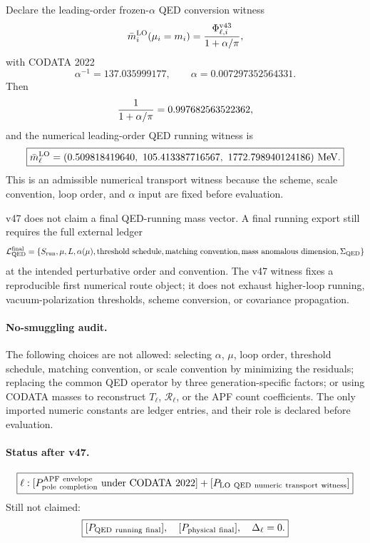 \begin{theorem}
Declare the leading-order frozen-\(\alpha\) QED conversion witness
\[
\bar m_i^{\rm LO}(\mu_i=m_i)
=
{\Phi_{\ell,i}^{\rm v43}\over 1+\alpha/\pi},
\]
with CODATA 2022
\[
\alpha^{-1}=137.035999177,
\qquad
\alpha=0.007297352564331.
\]
Then
\[
{1\over 1+\alpha/\pi}=0.997682563522362,
\]
and the numerical leading-order QED running witness is
\[
\boxed{
\bar m_\ell^{\rm LO}
=(0.509818419640,\ 105.413387716567,\ 1772.798940124186)\ {\rm MeV}.
}
\]
This is an admissible numerical transport witness because the scheme, scale convention, loop order, and \(\alpha\) input are fixed before evaluation.
\end{theorem}

\begin{corollary}
v47 does not claim a final QED-running mass vector.  A final running export still requires the full external ledger
\[
\mathcal L_{\rm QED}^{\rm final}
=\{S_{\rm run},\mu,L,\alpha(\mu),\text{threshold schedule},\text{matching convention},\text{mass anomalous dimension},\Sigma_{\rm QED}\}
\]
at the intended perturbative order and convention.  The v47 witness fixes a reproducible first numerical route object; it does not exhaust higher-loop running, vacuum-polarization thresholds, scheme conversion, or covariance propagation.
\end{corollary}

\paragraph{No-smuggling audit.}
The following choices are not allowed: selecting \(\alpha\), \(\mu\), loop order, threshold schedule, matching convention, or scale convention by minimizing the residuals; replacing the common QED operator by three generation-specific factors; or using CODATA masses to reconstruct \(T_\ell\), \(\mathcal R_\ell\), or the APF count coefficients.  The only imported numeric constants are ledger entries, and their role is declared before evaluation.

\paragraph{Status after v47.}
\[
\boxed{
\ell:
[P_{\rm pole\ completion}^{\rm APF\ envelope}\ {\rm under\ CODATA\ 2022}]
+
[P_{\rm LO\ QED\ numeric\ transport\ witness}]
}
\]
Still not claimed:
\[
\boxed{
[P_{\rm QED\ running\ final}],\quad
[P_{\rm physical\ final}],\quad
\Delta_\ell=0.
}
\]
